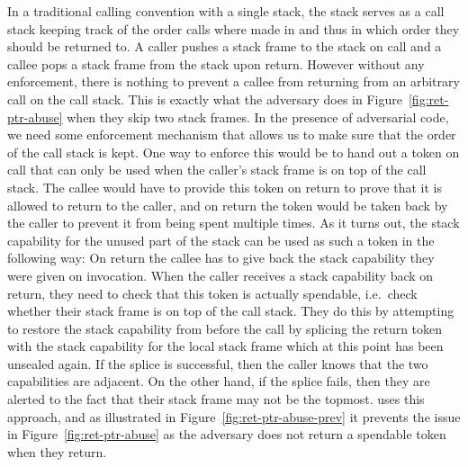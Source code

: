 \documentclass[acmsmall,review,anonymous]{acmart}\settopmatter{printfolios=true,printccs=false,printacmref=false}
\begin{document}
In a traditional calling convention with a single stack, the stack serves as a call stack keeping track of the order calls where made in and thus in which order they should be returned to.
A caller pushes a stack frame to the stack on call and a callee pops a stack frame from the stack upon return.
However without any enforcement, there is nothing to prevent a callee from returning from an arbitrary call on the call stack.
This is exactly what the adversary does in Figure~\ref{fig:ret-ptr-abuse} when they skip two stack frames.
In the presence of adversarial code, we need some enforcement mechanism that allows us to make sure that the order of the call stack is kept.
One way to enforce this would be to hand out a token on call that can only be used when the caller's stack frame is on top of the call stack.
The callee would have to provide this token on return to prove that it is allowed to return to the caller, and on return the token would be taken back by the caller to prevent it from being spent multiple times.
As it turns out, the stack capability for the unused part of the stack can be used as such a token in the following way:
On return the callee has to give back the stack capability they were given on invocation.
When the caller receives a stack capability back on return, they need to check that this token is actually spendable, i.e.\ check whether their stack frame is on top of the call stack.
They do this by attempting to restore the stack capability from before the call by splicing the return token with the stack capability for the local stack frame which at this point has been unsealed again.
If the splice is successful, then the caller knows that the two capabilities are adjacent. On the other hand, if the splice fails, then they are alerted to the fact that their stack frame may not be the topmost.
\stktokens{} uses this approach, and as illustrated in Figure~\ref{fig:ret-ptr-abuse-prev} it prevents the issue in Figure~\ref{fig:ret-ptr-abuse} as the adversary does not return a spendable token when they return.
\end{document}
